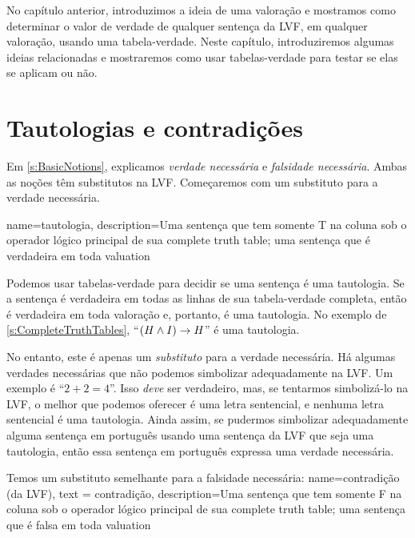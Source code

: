 No capítulo anterior, introduzimos a ideia de uma valoração e mostramos como determinar o valor de verdade de qualquer sentença da LVF, em qualquer valoração, usando uma tabela-verdade. Neste capítulo, introduziremos algumas ideias relacionadas e mostraremos como usar tabelas-verdade para testar se elas se aplicam ou não.


\section{Tautologias e contradições}
Em \cref{s:BasicNotions}, explicamos \emph{verdade necessária} e \emph{falsidade necessária}. Ambas as noções têm substitutos na LVF. Começaremos com um substituto para a verdade necessária.

{
name=tautologia,
description={Uma sentença que tem somente T na coluna sob o operador lógico principal de sua \gls{complete truth table}; uma sentença que é verdadeira em toda \gls{valuation}}
}

Podemos usar tabelas-verdade para decidir se uma sentença é uma tautologia. Se a sentença é verdadeira em todas as linhas de sua tabela-verdade completa, então é verdadeira em toda valoração e, portanto, é uma tautologia. No exemplo de \cref{s:CompleteTruthTables}, \textquotedblleft{}$(H \wedge I) \rightarrow H$\textquotedblright{} é uma tautologia.

No entanto, este é apenas um \emph{substituto} para a verdade necessária. Há algumas verdades necessárias que não podemos simbolizar adequadamente na LVF. Um exemplo é \textquotedblleft{}$2 + 2 = 4$\textquotedblright{}. Isso \emph{deve} ser verdadeiro, mas, se tentarmos simbolizá-lo na LVF, o melhor que podemos oferecer é uma letra sentencial, e nenhuma letra sentencial é uma tautologia. Ainda assim, se pudermos simbolizar adequadamente alguma sentença em português usando uma sentença da LVF que seja uma tautologia, então essa sentença em português expressa uma verdade necessária.

Temos um substituto semelhante para a falsidade necessária:
{
  name=contradição (da LVF),
  text = contradição,
description={Uma sentença que tem somente F na coluna sob o operador lógico principal de sua \gls{complete truth table}; uma sentença que é falsa em toda \gls{valuation}}
}

